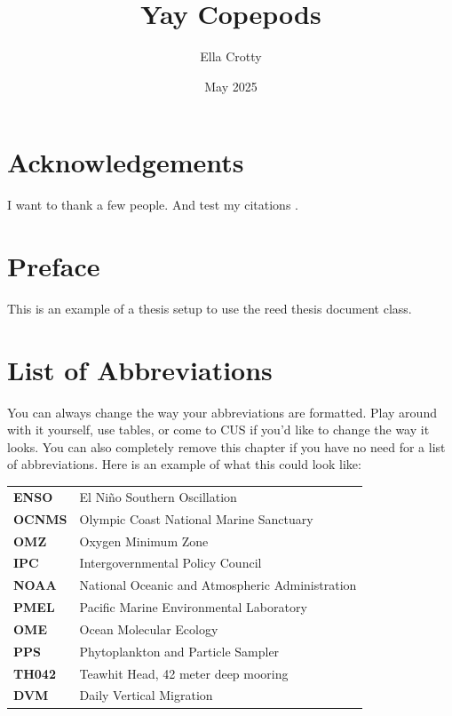 \documentclass[12pt,twoside]{reedthesis}
\title{Yay Copepods}
\author{Ella Crotty}
\date{May 2025}
\begin{document}
  \maketitle
  \frontmatter %
  \pagestyle{empty} %

    \chapter*{Acknowledgements}
	I want to thank a few people.
	And test my citations \autocite{Barth2024}.

    \chapter*{Preface}
	This is an example of a thesis setup to use the reed thesis document class.
	
    \chapter*{List of Abbreviations}
		You can always change the way your abbreviations are formatted. Play around with it yourself, use tables, or come to CUS if you'd like to change the way it looks. You can also completely remove this chapter if you have no need for a list of abbreviations. Here is an example of what this could look like:

	\begin{table}[h]
	\centering %
	\begin{tabular}{ll}
		\textbf{ENSO}  	&  El Ni\~{n}o Southern Oscillation \\
		\textbf{OCNMS}  	&  Olympic Coast National Marine Sanctuary \\
		\textbf{OMZ}  	&  Oxygen Minimum Zone \\
		\textbf{IPC}  	&  Intergovernmental Policy Council \\
		\textbf{NOAA}  	&  National Oceanic and Atmospheric Administration \\
		\textbf{PMEL}  	&  Pacific Marine Environmental Laboratory \\
		\textbf{OME}  	&  Ocean Molecular Ecology \\
		\textbf{PPS}  	&  Phytoplankton and Particle Sampler \\
		\textbf{TH042}  	&  Teawhit Head, 42 meter deep mooring \\
		\textbf{DVM}  	&  Daily Vertical Migration \\
	\end{tabular}
	\end{table}
	
\end{document}
